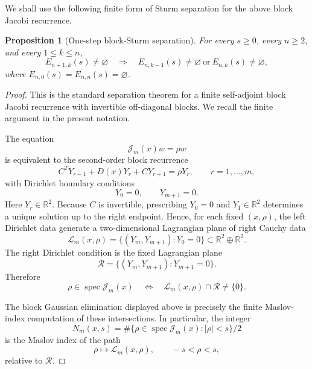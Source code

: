 \documentclass[11pt]{amsart}
\numberwithin{equation}{section}
\newtheorem{proposition}[theorem]{Proposition}
\DeclareMathOperator{\spec}{spec}
\begin{document}
We shall use the following finite form of Sturm separation for the above
block Jacobi recurrence.

\begin{proposition}[One-step block-Sturm separation]\label{prop:block-sturm}
For every \(s\ge0\), every \(n\ge2\), and every \(1\le k\le n\),
\[
        E_{n+1,k}(s)\ne\varnothing
        \quad\Longrightarrow\quad
        E_{n,k-1}(s)\ne\varnothing
        \ \text{or}\
        E_{n,k}(s)\ne\varnothing,
\]
where \(E_{n,0}(s)=E_{n,n}(s)=\varnothing\).
\end{proposition}

\begin{proof}
This is the standard separation theorem for a finite self-adjoint block
Jacobi recurrence with invertible off-diagonal blocks.  We recall the finite
argument in the present notation.

The equation
\[
        \mathcal J_m(x)w=\rho w
\]
is equivalent to the second-order block recurrence
\[
        C^TY_{r-1}+D(x)Y_r+CY_{r+1}=\rho Y_r,
        \qquad r=1,\dots,m,
\]
with Dirichlet boundary conditions
\[
        Y_0=0,\qquad Y_{m+1}=0.
\]
Here \(Y_r\in\mathbb R^2\).  Because \(C\) is invertible, prescribing
\(Y_0=0\) and \(Y_1\in\mathbb R^2\) determines a unique solution up to the
right endpoint.  Hence, for each fixed \((x,\rho)\), the left Dirichlet data
generate a two-dimensional Lagrangian plane of right Cauchy data
\[
        \mathcal L_m(x,\rho)
        =
        \{(Y_m,Y_{m+1}):Y_0=0\}
        \subset \mathbb R^2\oplus\mathbb R^2 .
\]
The right Dirichlet condition is the fixed Lagrangian plane
\[
        \mathcal R=\{(Y_m,Y_{m+1}):Y_{m+1}=0\}.
\]
Therefore
\[
        \rho\in\spec\mathcal J_m(x)
        \quad\Longleftrightarrow\quad
        \mathcal L_m(x,\rho)\cap\mathcal R\ne\{0\}.
\]

The block Gaussian elimination displayed above is precisely the finite
Maslov-index computation of these intersections.  In particular, the
integer
\[
        N_m(x,s)
        =
        \#\{\rho\in\spec\mathcal J_m(x):|\rho|<s\}/2
\]
is the Maslov index of the path
\[
        \rho\mapsto \mathcal L_m(x,\rho),
        \qquad -s<\rho<s,
\]
relative to \(\mathcal R\).


\end{proof}
\end{document}

